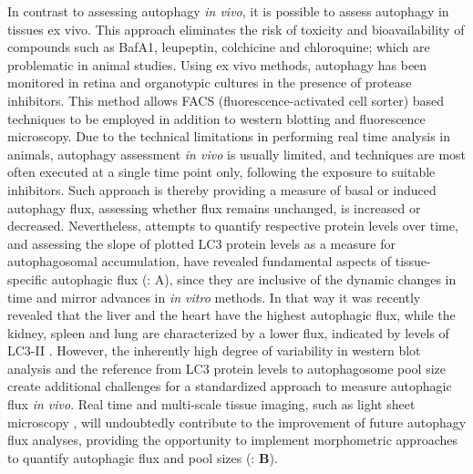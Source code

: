 In contrast to assessing autophagy \textit{in vivo}, it is possible to assess autophagy in tissues ex vivo. This approach eliminates the risk of toxicity and bioavailability of compounds such as BafA1, leupeptin, colchicine and chloroquine; which are problematic in animal studies. Using ex vivo methods, autophagy has been monitored in retina \citep{Esteban-Martinez2015} and organotypic cultures in the presence of protease inhibitors. This method allows FACS (fluorescence-activated cell sorter) based techniques to be employed in addition to western blotting and fluorescence microscopy. Due to the technical limitations in performing real time analysis in animals, autophagy assessment \textit{in vivo} is usually limited, and techniques are most often executed at a single time point only, following the exposure to suitable inhibitors. Such approach is thereby providing a measure of basal or induced autophagy flux, assessing whether flux remains unchanged, is increased or decreased. Nevertheless, attempts to quantify respective protein levels over time, and assessing the slope of plotted LC3 protein levels as a measure for autophagosomal accumulation, have revealed fundamental aspects of tissue- specific autophagic flux \citep{Haspel2011} (: A), since they are inclusive of the dynamic changes in time and mirror advances in \textit{in vitro} methods. In that way it was recently revealed that the liver and the heart have the highest autophagic flux, while the kidney, spleen and lung are characterized by a lower flux, indicated by levels of LC3-II \citep{Haspel2011}. However, the inherently high degree of variability in western blot analysis and the reference from LC3 protein levels to autophagosome pool size create additional challenges for a standardized approach to measure autophagic flux \textit{in vivo}. Real time and multi-scale tissue imaging, such as light sheet microscopy \citep{Pampaloni2013}, will undoubtedly contribute to the improvement of future autophagy flux analyses, providing the opportunity to implement morphometric approaches to quantify autophagic flux and pool sizes (: \textbf{B}). 

